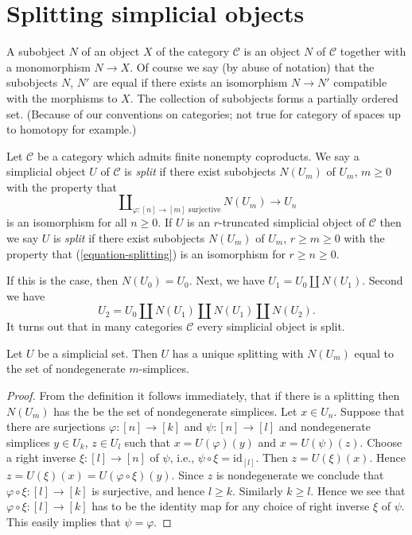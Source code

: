 \section{Splitting simplicial objects}
\label{section-splitting}

\noindent
A subobject $N$ of an object $X$ of the category $\mathcal{C}$
is an object $N$ of $\mathcal{C}$ together with a monomorphism
$N \to X$. Of course we say (by abuse of notation) that
the subobjects $N$, $N'$ are equal if there exists an isomorphism
$N \to N'$ compatible with the morphisms to $X$. The collection
of subobjects forms a partially ordered set. (Because of our
conventions on categories; not true for category of spaces
up to homotopy for example.)

\begin{definition}
\label{definition-split}
Let $\mathcal{C}$ be a category which admits finite nonempty coproducts.
We say a simplicial object $U$ of $\mathcal{C}$ is {\it split}
if there exist subobjects $N(U_m)$ of $U_m$, $m \geq 0$
with the property that
\begin{equation}
\label{equation-splitting}
\coprod\nolimits_{\varphi : [n] \to [m]\text{ surjective}}
N(U_m)
\longrightarrow
U_n
\end{equation}
is an isomorphism for all $n \geq 0$. If $U$ is an $r$-truncated
simplicial object of $\mathcal{C}$ then we say $U$ is {\it split}
if there exist subobjects $N(U_m)$ of $U_m$, $r \geq m \geq 0$
with the property that (\ref{equation-splitting})
is an isomorphism for $r \geq n \geq 0$.
\end{definition}

\noindent
If this is the case, then $N(U_0) = U_0$. Next, we have
$U_1 = U_0 \amalg N(U_1)$. Second we have
$$
U_2 = U_0 \amalg N(U_1) \amalg N(U_1) \amalg N(U_2).
$$
It turns out that in many categories $\mathcal{C}$
every simplicial object is split.

\begin{lemma}
\label{lemma-splitting-simplicial-sets}
Let $U$ be a simplicial set. Then $U$ has a unique splitting
with $N(U_m)$ equal to the set of nondegenerate $m$-simplices.
\end{lemma}

\begin{proof}
From the definition it follows immediately, that if there is a
splitting then $N(U_m)$ has the be the set of nondegenerate simplices.
Let $x \in U_n$. Suppose that there are surjections $\varphi : [n] \to [k]$
and $\psi : [n] \to [l]$ and nondegenerate simplices
$y \in U_k$, $z \in U_l$ such that $x = U(\varphi)(y)$
and $x = U(\psi)(z)$. Choose a right inverse $\xi : [l] \to [n]$
of $\psi$, i.e., $\psi \circ \xi = \text{id}_{[l]}$.
Then $z = U(\xi)(x)$. Hence $z = U(\xi)(x) = U(\varphi \circ \xi)(y)$.
Since $z$ is nondegenerate we conclude that $\varphi \circ \xi :
[l] \to [k]$ is surjective, and hence $l \geq k$. Similarly
$k \geq l$. Hence we see that $\varphi \circ \xi : [l] \to [k]$
has to be the identity map for any choice of right inverse
$\xi$ of $\psi$. This easily implies that $\psi = \varphi$.
\end{proof}

